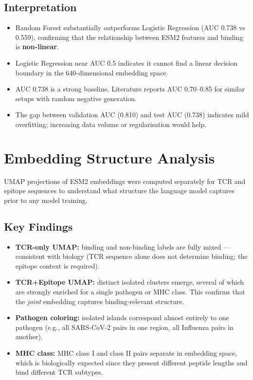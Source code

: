 \documentclass[11pt,a4paper]{article}
\begin{document}
\subsection{Interpretation}

\begin{itemize}[leftmargin=1.4em, itemsep=3pt]
  \item Random Forest substantially outperforms Logistic Regression (AUC 0.738 vs 0.559),
        confirming that the relationship between ESM2 features and binding is \textbf{non-linear}.
  \item Logistic Regression near AUC 0.5 indicates it cannot find a linear decision
        boundary in the 640-dimensional embedding space.
  \item AUC 0.738 is a strong baseline. Literature reports AUC 0.70--0.85 for similar
        setups with random negative generation.
  \item The gap between validation AUC (0.810) and test AUC (0.738) indicates mild
        overfitting; increasing data volume or regularisation would help.
\end{itemize}

\section{Embedding Structure Analysis}

UMAP projections of ESM2 embeddings were computed separately for TCR and epitope
sequences to understand what structure the language model captures prior to any
model training.

\subsection{Key Findings}

\begin{itemize}[leftmargin=1.4em, itemsep=3pt]
  \item \textbf{TCR-only UMAP:} binding and non-binding labels are fully mixed ---
        consistent with biology (TCR sequence alone does not determine binding;
        the epitope context is required).
  \item \textbf{TCR+Epitope UMAP:} distinct isolated clusters emerge, several
        of which are strongly enriched for a single pathogen or MHC class.
        This confirms that the \emph{joint} embedding captures binding-relevant structure.
  \item \textbf{Pathogen coloring:} isolated islands correspond almost entirely to one
        pathogen (e.g., all SARS-CoV-2 pairs in one region, all Influenza pairs in another).
  \item \textbf{MHC class:} MHC class I and class II pairs separate in embedding space,
        which is biologically expected since they present different peptide lengths and
        bind different TCR subtypes.
\end{itemize}
\end{document}
